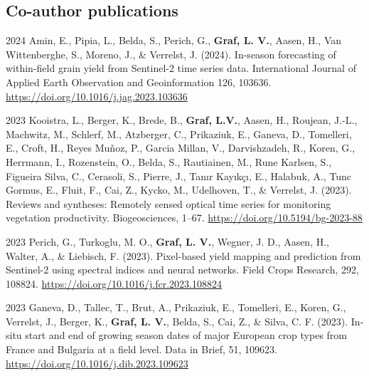 \begin{cv}{}
\begin{cvlist}{}
\end{cvlist}

\subsection{Co-author publications}

\begin{cvlist}

    \item[2024]
    Amin, E., Pipia, L., Belda, S., Perich, G., \textbf{Graf, L. V.}, Aasen, H., Van Wittenberghe, S., Moreno, J., \& Verrelst, J. (2024). In-season forecasting of within-field grain yield from Sentinel-2 time series data. International Journal of Applied Earth Observation and Geoinformation 126, 103636. \url{https://doi.org/10.1016/j.jag.2023.103636}

    \item[2023]
    Kooistra, L., Berger, K., Brede, B., \textbf{Graf, L.V.}, Aasen, H., Roujean, J.-L., Machwitz, M., Schlerf, M., Atzberger, C., Prikaziuk, E., Ganeva, D., Tomelleri, E., Croft, H., Reyes Muñoz, P., Garcia Millan, V., Darvishzadeh, R., Koren, G., Herrmann, I., Rozenstein, O., Belda, S., Rautiainen, M., Rune Karlsen, S., Figueira Silva, C., Cerasoli, S., Pierre, J., Tanır Kayıkçı, E., Halabuk, A., Tunc Gormus, E., Fluit, F., Cai, Z., Kycko, M., Udelhoven, T., \& Verrelst, J. (2023). Reviews and syntheses: Remotely sensed optical time series for monitoring vegetation productivity. Biogeosciences, 1–67. \url{https://doi.org/10.5194/bg-2023-88}

    \item[2023]
    Perich, G., Turkoglu, M. O., \textbf{Graf, L. V.}, Wegner, J. D., Aasen, H., Walter, A., \& Liebisch, F. (2023). Pixel-based yield mapping and prediction from Sentinel-2 using spectral indices and neural networks. Field Crops Research, 292, 108824. \url{https://doi.org/10.1016/j.fcr.2023.108824}

    \item[2023]
    Ganeva, D., Tallec, T., Brut, A., Prikaziuk, E., Tomelleri, E., Koren, G., Verrelst, J., Berger, K., \textbf{Graf, L. V.}, Belda, S., Cai, Z., \& Silva, C. F. (2023). In-situ start and end of growing season dates of major European crop types from France and Bulgaria at a field level. Data in Brief, 51, 109623. \url{https://doi.org/10.1016/j.dib.2023.109623}



 
\end{cvlist}

\end{cv}
